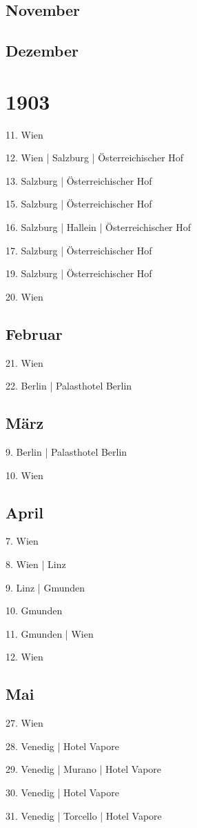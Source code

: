 \documentclass[twoside=false,titlepage=false,open=any, parskip=never, fontsize=10pt, headings=small, chapterprefix=false, appendixprefix=false, DIV=15]{scrbook}
\begin{document}
\begin{multicols}{3}
            \section*{November}
            \section*{Dezember}
            \chapter*{1903}
            11. Wien\par
            12. Wien | Salzburg | Österreichischer Hof\par
            13. Salzburg | Österreichischer Hof\par
            15. Salzburg | Österreichischer Hof\par
            16. Salzburg | Hallein | Österreichischer Hof\par
            17. Salzburg | Österreichischer Hof\par
            19. Salzburg | Österreichischer Hof\par
            20. Wien\par
            \section*{Februar}
            21. Wien\par
            22. Berlin | Palasthotel Berlin\par
            \section*{März}
            9. Berlin | Palasthotel Berlin\par
            10. Wien\par
            \section*{April}
            7. Wien\par
            8. Wien | Linz\par
            9. Linz | Gmunden\par
            10. Gmunden\par
            11. Gmunden | Wien\par
            12. Wien\par
            \section*{Mai}
            27. Wien\par
            28. Venedig | Hotel Vapore\par
            29. Venedig | Murano | Hotel Vapore\par
            30. Venedig | Hotel Vapore\par
            31. Venedig | Torcello | Hotel Vapore\par

\end{multicols}
\end{document}
